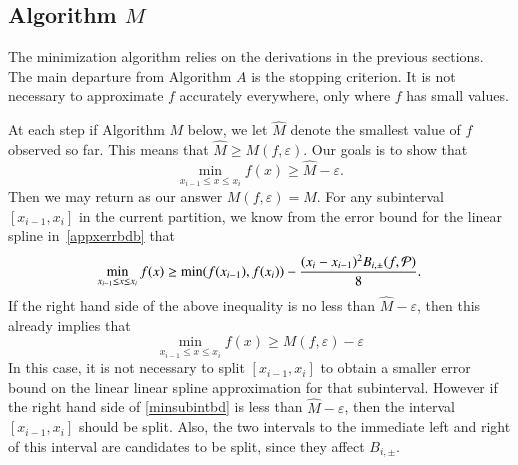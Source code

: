 \documentclass[review]{elsarticle}
\newcommand{\abstol}{\varepsilon}
\theoremstyle{definition}
\newcommand{\hM}{\widehat{M}}
\newcommand{\minfii}{\min(f(x_{i-1}), f(x_i))} %
\begin{document}
\subsection{Algorithm $M$}  \label{sec:minalgo}
The minimization algorithm relies on the derivations in the previous sections.  The main departure from Algorithm $A$ is the stopping criterion.  It is not necessary to approximate $f$ accurately everywhere, only where $f$ has small values.

At each step if Algorithm $M$ below, we let $\hM$ denote the smallest value of $f$ observed so far.  This means that $\hM \ge M(f,\abstol)$.  Our goals is to show that
\[
\min_{x_{i-1} \le x \le x_i} f(x) \ge \hM - \abstol.
\]
Then we may return as our answer $M(f,\abstol) = \hM$.
For any subinterval $[x_{i-1}, x_i]$ in the current partition, we know from the error bound for the linear spline 
in~\eqref{appxerrbdb} that
\begin{equation} \label{minsubintbd}
\min_{x_{i-1} \le x \le x_i} f(x) \ge \minfii -\frac{(x_i - x_{i-1})^2B_{i,\pm}(f,\cp)}{8}.
\end{equation}
If the right hand side of the above inequality is no less than $\hM - \abstol$, then this already implies that
\[
\min_{x_{i-1} \le x \le x_i} f(x) \ge M(f,\abstol) - \abstol
\]
In this case, it is not necessary to split $[x_{i-1}, x_i]$ to obtain a smaller error bound on the linear linear spline approximation for that subinterval.  However if the right hand side of \eqref{minsubintbd} is less than $\hM - \abstol$, then the interval $[x_{i-1}, x_i]$ should be split.  Also, the two intervals to the immediate left and right of this interval are candidates to be split, since they affect $B_{i,\pm}$.
\end{document}
